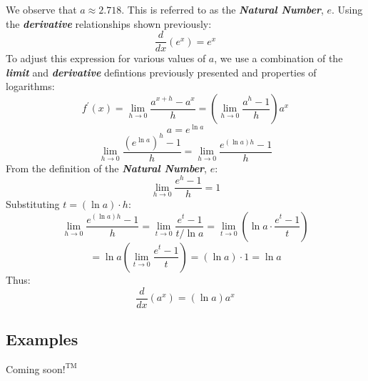 %
We observe that $a \approx 2.718$. This is referred to as the \textbf{\textit{Natural Number}}, $e$. Using the \textbf{\textit{derivative}} relationships shown previously:
\begin{equation}
\frac{d}{dx}\left(e^x\right) = e^x
\end{equation}
%
To adjust this expression for various values of $a$, we use a combination of the \textbf{\textit{limit}} and \textbf{\textit{derivative}} defintions previously presented and properties of logarithms:
%
\begin{equation}
f^\prime(x) = \lim_{h \rightarrow 0} \frac{a^{x+h} - a^x}{h} = \left(\lim_{h \rightarrow 0} \frac{a^h - 1}{h} \right)a^x
\end{equation}
%
\begin{equation}
a = e^{\ln a}
\end{equation}
%
\begin{equation}
\lim_{h \rightarrow 0} \frac{\left(e^{\ln a}\right)^h - 1}{h} =  \lim_{h \rightarrow 0} \frac{e^{\left({\ln a}\right)h} - 1}{h}
\end{equation}
%
From the definition of the \textbf{\textit{Natural Number}}, $e$:
%
\begin{equation}
\lim_{h \rightarrow 0} \frac{e^h - 1}{h} = 1
\end{equation}
%
Substituting $t = (\ln a) \cdot h$:
%
\begin{equation}
\lim_{h \rightarrow 0}\frac{e^{\left(\ln a\right)h} - 1}{h} = \lim_{t \rightarrow 0} \frac{e^t - 1}{t / \ln a} = \lim_{t \rightarrow 0}\left(\ln a \cdot \frac{e^t - 1}{t}\right)
\end{equation}
%
\begin{equation}
= \ln a \left(\lim_{t \rightarrow 0} \frac{e^t - 1}{t}\right) = (\ln a) \cdot 1 = \ln a
\end{equation}
%
Thus:
%
\begin{equation}
\frac{d}{dx}\left(a^x\right) = (\ln a)a^x
\end{equation}

\begin{center}
\section*{\small Examples}
Coming soon$!^{\text{TM}}$
\end{center}

